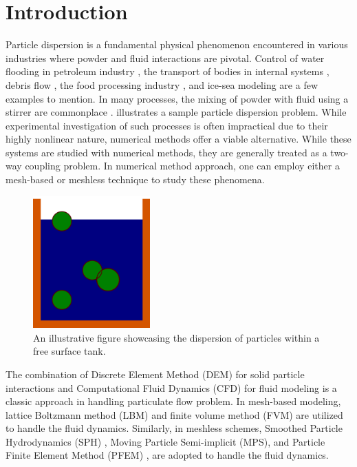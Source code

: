 \documentclass[preprint,12pt]{elsarticle}
\begin{document}


\FloatBarrier%
\section{Introduction}

Particle dispersion is a fundamental physical phenomenon encountered in
various industries where powder and fluid interactions are pivotal.  Control
of water flooding in petroleum industry \cite{wang2023developments}, the
transport of bodies in internal systems \cite{Dai2021}, debris flow
\cite{Qingyun2022}, the food processing industry \cite{Karunasena2014}, and
ice-sea modeling \cite{Mintu2018} are a few examples to mention.  In many
processes, the mixing of powder with fluid using a stirrer are commonplace
\cite{li2022study}.   illustrates a sample particle
dispersion problem.  While experimental investigation of such processes is
often impractical due to their highly nonlinear nature, numerical methods
offer a viable alternative.  While these systems are studied with numerical
methods, they are generally treated as a two-way coupling problem. In
numerical method approach, one can employ either a mesh-based or meshless
technique to study these phenomena.

\begin{figure}[!htpb]
  \centering
  \includegraphics[width=0.4\textwidth]{images/hs_tank_fluid_with_particles}
  \caption{An illustrative figure showcasing the dispersion of particles within a free surface tank.}
  \label{intro:schematic}
\end{figure}



The combination of Discrete Element Method (DEM) for solid particle
interactions and Computational Fluid Dynamics (CFD) for fluid modeling is a
classic approach in handling particulate flow problem. In mesh-based modeling,
lattice Boltzmann method (LBM) \cite{xiong2014lbm} and finite volume method
(FVM) \cite{kloss2012models} are utilized to handle the fluid
dynamics. Similarly, in meshless schemes, Smoothed Particle Hydrodynamics
(SPH) \cite{peng2021fully}, Moving Particle Semi-implicit (MPS), and Particle
Finite Element Method (PFEM) \cite{li2019modeling, franci2020pfem}, are
adopted to handle the fluid dynamics.
\end{document}
